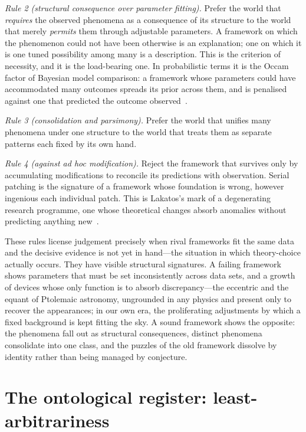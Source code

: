 \documentclass[11pt,a4paper]{article}
\begin{document}
\emph{Rule 2 (structural consequence over parameter fitting).} Prefer the world that \emph{requires} the observed phenomena as a consequence of its structure to the world that merely \emph{permits} them through adjustable parameters. A framework on which the phenomenon could not have been otherwise is an explanation; one on which it is one tuned possibility among many is a description. This is the criterion of necessity, and it is the load-bearing one. In probabilistic terms it is the Occam factor of Bayesian model comparison: a framework whose parameters could have accommodated many outcomes spreads its prior across them, and is penalised against one that predicted the outcome observed~\cite{JefferysBerger1992}.

\emph{Rule 3 (consolidation and parsimony).} Prefer the world that unifies many phenomena under one structure to the world that treats them as separate patterns each fixed by its own hand.

\emph{Rule 4 (against ad hoc modification).} Reject the framework that survives only by accumulating modifications to reconcile its predictions with observation. Serial patching is the signature of a framework whose foundation is wrong, however ingenious each individual patch. This is Lakatos's mark of a degenerating research programme, one whose theoretical changes absorb anomalies without predicting anything new~\cite{Lakatos1970}.

These rules license judgement precisely when rival frameworks fit the same data and the decisive evidence is not yet in hand---the situation in which theory-choice actually occurs. They have visible structural signatures. A failing framework shows parameters that must be set inconsistently across data sets, and a growth of devices whose only function is to absorb discrepancy---the eccentric and the equant of Ptolemaic astronomy, ungrounded in any physics and present only to recover the appearances; in our own era, the proliferating adjustments by which a fixed background is kept fitting the sky. A sound framework shows the opposite: the phenomena fall out as structural consequences, distinct phenomena consolidate into one class, and the puzzles of the old framework dissolve by identity rather than being managed by conjecture.

\section{The ontological register: least-arbitrariness}\label{sec:least-arbitrariness}
\end{document}
